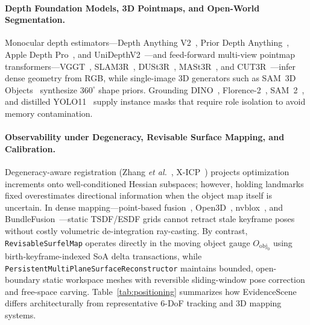 \documentclass{evidencescene}
\begin{document}
\paragraph{Depth Foundation Models, 3D Pointmaps, and Open-World Segmentation.} Monocular depth estimators---Depth Anything V2~\cite{yang2024depthv2}, Prior Depth Anything~\cite{wang2025priorda}, Apple Depth Pro~\cite{bochkovskii2025depthpro}, and UniDepthV2~\cite{piccinelli2025unidepthv2}---and feed-forward multi-view pointmap transformers---VGGT~\cite{wang2025vggt}, SLAM3R~\cite{liu2025slam3r}, DUSt3R~\cite{wang2024dust3r}, MASt3R~\cite{leroy2024mast3r}, and CUT3R~\cite{wang2025cut3r}---infer dense geometry from RGB, while single-image 3D generators such as SAM~3D Objects~\cite{sam3d2025} synthesize $360^\circ$ shape priors. Grounding DINO~\cite{liu2023grounding}, Florence-2~\cite{xiao2024florence2}, SAM~2~\cite{ravi2024sam2}, and distilled YOLO11~\cite{jocher2024yolo11} supply instance masks that require role isolation to avoid memory contamination.

\paragraph{Observability under Degeneracy, Revisable Surface Mapping, and Calibration.} Degeneracy-aware registration (Zhang \emph{et al.}~\cite{zhang2016degeneracy}, X-ICP~\cite{xicp}) projects optimization increments onto well-conditioned Hessian subspaces; however, holding landmarks fixed overestimates directional information when the object map itself is uncertain. In dense mapping---point-based fusion~\cite{keller2013point}, Open3D~\cite{zhou2018open3d}, nvblox~\cite{millane2024nvblox}, and BundleFusion~\cite{bundlefusion}---static TSDF/ESDF grids cannot retract stale keyframe poses without costly volumetric de-integration ray-casting. By contrast, \texttt{RevisableSurfelMap} operates directly in the moving object gauge $O_{\mathrm{obj}_0}$ using birth-keyframe-indexed SoA delta transactions, while \texttt{PersistentMultiPlaneSurfaceReconstructor} maintains bounded, open-boundary static workspace meshes with reversible sliding-window pose correction and free-space carving. Table~\ref{tab:positioning} summarizes how EvidenceScene differs architecturally from representative 6-DoF tracking and 3D mapping systems.
\end{document}
